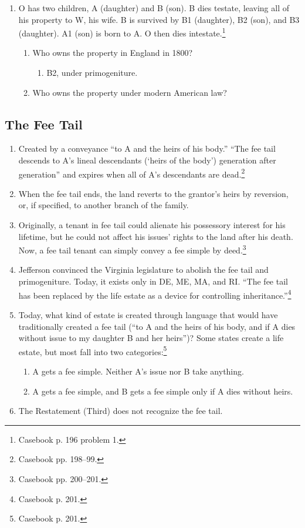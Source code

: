 \begin{enumerate}
    \item O has two children, A (daughter) and B (son). B dies testate, 
    leaving all of his property to W, his wife. B is survived by B1 
    (daughter), B2 (son), and B3 (daughter). A1 (son) is born to A. O then 
    dies intestate.\footnote{Casebook p. 196 problem 1.}
    \begin{enumerate}
        \item Who owns the property in England in 1800?
        \begin{enumerate}
            \item B2, under primogeniture.
        \end{enumerate}
        \item Who owns the property under modern American law?
    \end{enumerate}
\end{enumerate}

\subsection{The Fee Tail}

\begin{enumerate}
    \item Created by a conveyance ``to A and the heirs of his 
    body.'' ``The fee tail descends to A's lineal descendants (`heirs of the 
    body') generation after generation'' and expires when all of A's 
    descendants are dead.\footnote{Casebook pp. 198--99.}
    \item When the fee tail ends, the land reverts to the grantor's heirs by 
    reversion, or, if specified, to another branch of the family.
    \item Originally, a tenant in fee tail could alienate his possessory 
    interest for his lifetime, but he could not affect his issues' rights to 
    the land after his death. Now, a fee tail tenant can simply convey a fee 
    simple by deed.\footnote{Casebook pp. 200--201.}
    \item Jefferson convinced the Virginia legislature to abolish the fee tail 
    and primogeniture. Today, it exists only in DE, ME, MA, and RI. ``The fee 
    tail has been replaced by the life estate as a device for controlling 
    inheritance.''\footnote{Casebook p. 201.}
    \item Today, what kind of estate is created through language that would 
    have traditionally created a fee tail (``to A and the heirs of his 
    body, and if A dies without issue to my daughter B and her heirs'')? Some 
    states create a life estate, but most fall into two 
    categories:\footnote{Casebook p. 201.}
    \begin{enumerate}
        \item A gets a fee simple. Neither A's issue nor B take anything.
        \item A gets a fee simple, and B gets a fee simple only if A dies 
        without heirs.
    \end{enumerate}
    \item The Restatement (Third) does not recognize the fee tail.
\end{enumerate}

